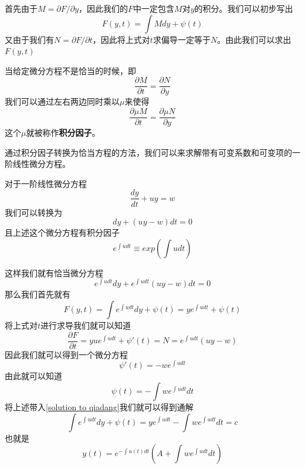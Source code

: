 \documentclass[UTF8,12pt]{ctexart}
\numberwithin{equation}{section} %
\numberwithin{figure}{section}
\numberwithin{table}{section}
\begin{document}
	首先由于$M = \partial F/\partial y$，因此我们的$F$中一定包含$M$对$y$的积分。我们可以初步写出
	\begin{equation}
		F(y,t) = \int Mdy + \psi (t)
	\end{equation}
	又由于我们有$N = \partial F/\partial t$，因此将上式对$t$求偏导一定等于$N$。由此我们可以求出$F(y,t)$
	
	当给定微分方程不是恰当的时候，即
	\begin{equation}
		\frac{\partial M}{\partial t} = \frac{\partial N}{\partial y}
	\end{equation}
	我们可以通过左右两边同时乘以$\mu$来使得
	\begin{equation}
		\frac{\partial \mu M}{\partial t} = \frac{\partial \mu N}{\partial y}
	\end{equation}
	这个$\mu$就被称作\textbf{积分因子}。
	
	通过积分因子转换为恰当方程的方法，我们可以来求解带有可变系数和可变项的一阶线性微分方程。
	
	对于一阶线性微分方程
	\begin{equation}
		\frac{dy}{dt} + uy = w
	\end{equation}
	我们可以转换为
	\begin{equation}
		dy + (uy-w)dt = 0
	\end{equation}
	且上述这个微分方程有积分因子
	\begin{equation}
		e^{\int udt} \equiv exp(\int udt)
	\end{equation}

	这样我们就有恰当微分方程
	\begin{equation}
		e^{\int udt}dy + e^{\int udt}(uy-w)dt = 0
	\end{equation}
	那么我们首先就有
	\begin{equation}
		F(y,t) = \int e^{\int udt}dy + \psi(t) = ye^{\int udt} + \psi (t) \label{solution to qiadang}
	\end{equation}
	将上式对$t$进行求导我们就可以知道
	\begin{equation}
		\frac{\partial F}{\partial t} = yue^{\int udt} + \psi' (t) = N = e^{\int udt}(uy-w)
	\end{equation}
	因此我们就可以得到一个微分方程
	\begin{equation}
		\psi' (t) = -we^{\int udt}
	\end{equation}
	由此就可以知道
	\begin{equation}
		\psi (t) = -\int we^{\int udt} dt
	\end{equation}
	将上述带入\ref{solution to qiadang}我们就可以得到通解
	\begin{equation}
		\int e^{\int udt}dy + \psi(t) = ye^{\int udt} -\int we^{\int udt} dt = c
	\end{equation}
	也就是
	\begin{equation}
		y(t) = e^{-\int u(t)dt}(A + \int we^{\int udt}dt)
	\end{equation}
	
\end{document}
